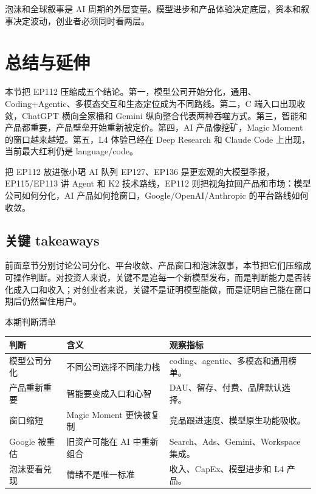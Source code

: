 \documentclass[a4paper]{article}
\begin{document}
泡沫和全球叙事是 AI 周期的外层变量。模型进步和产品体验决定底层，资本和叙事决定波动，创业者必须同时看两层。

\section{总结与延伸}

本节把 EP112 压缩成五个结论。第一，模型公司开始分化，通用、Coding+Agentic、多模态交互和生态定位成为不同路线。第二，C 端入口出现收敛，ChatGPT 横向全家桶和 Gemini 纵向整合代表两种吞噬方式。第三，智能和产品都重要，产品壁垒开始重新被定价。第四，AI 产品像挖矿，Magic Moment 的窗口越来越短。第五，L4 体验已经在 Deep Research 和 Claude Code 上出现，当前最大红利仍是 language/code。

\begin{importantbox}{把 EP112 放进张小珺 AI 队列}
EP127、EP136 是更宏观的大模型季报，EP115/EP113 讲 Agent 和 K2 技术路线，EP112 则把视角拉回产品和市场：模型公司如何分化，AI 产品如何抢窗口，Google/OpenAI/Anthropic 的平台路线如何收敛。
\end{importantbox}

\subsection{关键 takeaways}

前面章节分别讨论公司分化、平台收敛、产品窗口和泡沫叙事，本节把它们压缩成可操作判断。对投资人来说，关键不是追每一个新模型发布，而是判断能力是否转化成入口和收入；对创业者来说，关键不是证明模型能做，而是证明自己能在窗口期后仍然留住用户。

\begin{knowledgebox}{本期判断清单}
\begin{tabularx}{\textwidth}{p{}p{}X}
\toprule
判断 & 含义 & 观察指标 \\
\midrule
模型公司分化 & 不同公司选择不同能力栈 & coding、agentic、多模态和通用榜单。 \\
产品重新重要 & 智能要变成入口和心智 & DAU、留存、付费、品牌默认选择。 \\
窗口缩短 & Magic Moment 更快被复制 & 竞品跟进速度、模型原生功能吸收。 \\
Google 被重估 & 旧资产可能在 AI 中重新组合 & Search、Ads、Gemini、Workspace 集成。 \\
泡沫要看兑现 & 情绪不是唯一标准 & 收入、CapEx、模型进步和 L4 产品。 \\
\bottomrule
\end{tabularx}
\end{knowledgebox}
\end{document}
